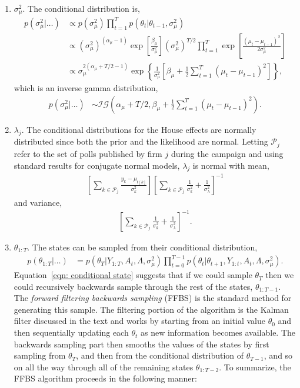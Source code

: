 \documentclass[12pt,final,fleqn]{article}
\theoremstyle{plain}
\begin{document}
\begin{enumerate}
\item $\sigma_\mu^2$. The conditional distribution is,
\begin{align}
p(\sigma_\mu^2|\ldots)&\propto p(\sigma_\mu^2) \prod_{t=1}^T p(\theta_{t}|\theta_{t-1}, \sigma_\mu^2) \\
&\propto (\sigma_\mu^2)^{(\alpha_\mu - 1)}\exp\left[\frac{\beta_\mu}{\sigma_\mu^2}\right](\sigma_\mu^2)^{T/2} \prod_{t=1}^T \exp\left[\frac{(\mu_{t} - \mu_{t-1})^2}{2\sigma_\mu^2}\right]\\
&\propto \sigma_\mu^{2(\alpha_\mu + T/2 - 1)}\exp\left\{\frac{1}{\sigma_\mu^2}\left[\beta_\mu + \frac{1}{2}\sum_{t=1}^T(\mu_{t} - \mu_{t-1})^2\right]\right\},
\end{align}
which is an inverse gamma distribution,
\begin{align}
p(\sigma_\mu^2|\ldots)&\sim \mathcal{IG}\left(\alpha_\mu + T/2, \beta_\mu + \frac{1}{2}\sum_{t=1}^T (\mu_{t} - \mu_{t-1})^2  \right).
\end{align}
\item $\lambda_j$. The conditional distributions for the House effects are normally distributed since both the prior and the likelihood are normal. Letting $\mathcal{P}_j$ refer to the set of polls published by firm $j$ during the campaign and using standard results for conjugate normal models, $\lambda_j$ is normal with mean,
\begin{align}
\left[\sum_{k \in \mathcal{P}_j}\frac{y_k - \mu_{t[k]}}{\sigma^2_k}\right] \left[\sum_{k \in \mathcal{P}_j} \frac{1}{\sigma^2_k} + \frac{1}{\sigma^2_\lambda}\right]^{-1}
\end{align}
and variance,
\begin{align}
\left[\sum_{k \in \mathcal{P}_j} \frac{1}{\sigma^2_k} + \frac{1}{\sigma^2_\lambda}\right]^{-1}.
\end{align}
\item $\theta_{1:T}$. The states can be sampled from their conditional distribution,
\begin{align}
\label{eqn: conditional state}
p(\theta_{1:T}|\ldots)&= p(\theta_T| Y_{1:T}, A_t, \Lambda, \sigma^2_\mu) \prod_{t=0}^{T-1} p(\theta_t|\theta_{t+1}, Y_{1:t}, A_t, \Lambda, \sigma^2_\mu).
\end{align}
Equation~\ref{eqn: conditional state} suggests that if we could sample $\theta_T$ then we could recursively backwards sample through the rest of the states, $\theta_{1:T-1}$. The \emph{forward filtering backwards sampling} (FFBS) is the standard method for generating this sample. The filtering portion of the algorithm is the Kalman filter discussed in the text and works by starting from an initial value $\theta_0$ and then sequentially updating each $\theta_t$ as new information becomes available. The backwards sampling part then smooths the values of the states by first sampling from $\theta_T$, and then from the conditional distribution of $\theta_{T-1}$, and so on all the way through all of the remaining states $\theta_{1:T-2}$. To summarize, the FFBS algorithm proceeds in the following manner: 

\end{enumerate}
\end{document}
